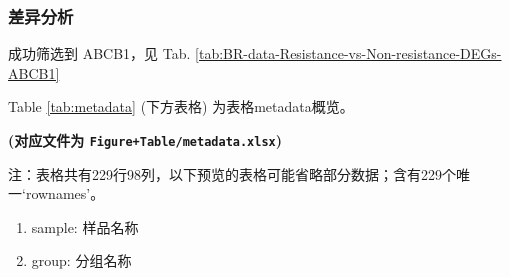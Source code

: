 \documentclass[
]{article}
\providecommand{\tightlist}{%
  \setlength{\itemsep}{0pt}\setlength{\parskip}{0pt}}
\begin{document}
\hypertarget{ux5deeux5f02ux5206ux6790}{%
\subsubsection{差异分析}\label{ux5deeux5f02ux5206ux6790}}

成功筛选到 ABCB1，见 Tab. \ref{tab:BR-data-Resistance-vs-Non-resistance-DEGs-ABCB1}

Table \ref{tab:metadata} (下方表格) 为表格metadata概览。

\textbf{(对应文件为 \texttt{Figure+Table/metadata.xlsx})}

\begin{center}\begin{tcolorbox}[colback=gray!10, colframe=gray!50, width=0.9\linewidth, arc=1mm, boxrule=0.5pt]注：表格共有229行98列，以下预览的表格可能省略部分数据；含有229个唯一`rownames'。
\end{tcolorbox}
\end{center}
\begin{center}\begin{tcolorbox}[colback=gray!10, colframe=gray!50, width=0.9\linewidth, arc=1mm, boxrule=0.5pt]\begin{enumerate}\tightlist
\item sample:  样品名称
\item group:  分组名称
\end{enumerate}\end{tcolorbox}
\end{center}
\end{document}

